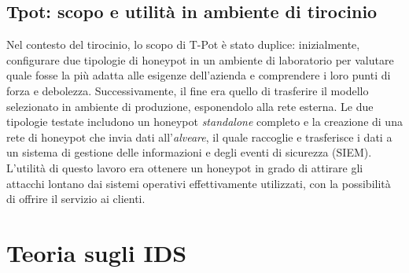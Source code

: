 \subsection{Tpot: scopo e utilità in ambiente di tirocinio}
Nel contesto del tirocinio, lo scopo di T-Pot è stato duplice: inizialmente, configurare due tipologie di honeypot in un ambiente di laboratorio per valutare quale fosse la più adatta alle esigenze dell'azienda e comprendere i loro punti di forza e debolezza. Successivamente, il fine era quello di trasferire il modello selezionato in ambiente di produzione, esponendolo alla rete esterna. Le due tipologie testate includono un honeypot \textit{standalone} completo e la creazione di una rete di honeypot che invia dati all'\textit{alveare}, il quale raccoglie e trasferisce i dati a un sistema di gestione delle informazioni e degli eventi di sicurezza (SIEM). L'utilità di questo lavoro era ottenere un honeypot in grado di attirare gli attacchi lontano dai sistemi operativi effettivamente utilizzati, con la possibilità di offrire il servizio ai clienti.\\
\newpage

\section{Teoria sugli IDS}
